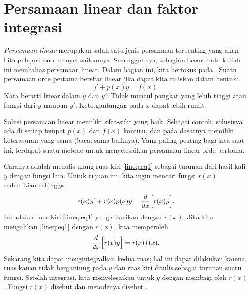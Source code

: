 \sectionnewpage
\section{Persamaan linear dan faktor integrasi}
\label{intfactor:section}



\emph{Persamaan linear}
merupakan salah satu jenis persamaan terpenting yang akan kita pelajari cara menyelesaikannya.
Sesungguhnya, sebagian besar mata kuliah ini membahas persamaan
linear. Dalam bagian ini, kita berfokus pada
\emph{}.
Suatu persamaan orde pertama bersifat linear jika dapat kita tuliskan
dalam bentuk:
\begin{equation} \label{lineq:eq1}
y' + p(x) y = f(x) .
\end{equation}
Kata
 berarti linear dalam $y$ dan $y'$:
Tidak muncul pangkat yang lebih tinggi atau fungsi dari $y$ maupun $y'$.
Ketergantungan pada $x$ dapat lebih
rumit.

Solusi persamaan linear memiliki sifat-sifat yang baik. Sebagai contoh,
solusinya ada di setiap tempat $p(x)$ dan $f(x)$ kontinu,
dan pada dasarnya memiliki
keteraturan yang sama (baca: sama baiknya). Yang paling penting bagi kita saat ini,
terdapat suatu metode untuk menyelesaikan persamaan linear orde pertama.

Caranya adalah menulis ulang ruas kiri
\eqref{lineq:eq1} sebagai turunan dari hasil kali $y$ dengan fungsi
lain.
Untuk tujuan ini,
kita ingin mencari fungsi $r(x)$ sedemikian sehingga
\begin{equation*}
r(x) y' + r(x) p(x) y = \frac{d}{dx}\Bigl[ r(x) y \Bigr] .
\end{equation*}
Ini adalah ruas kiri
\eqref{lineq:eq1} yang dikalikan dengan $r(x)$. Jika kita mengalikan \eqref{lineq:eq1} dengan
$r(x)$, kita memperoleh
\begin{equation*}
\frac{d}{dx}\Bigl[ r(x) y \Bigr] = r(x)f(x) .
\end{equation*}
Sekarang kita dapat mengintegralkan kedua ruas; hal ini dapat dilakukan karena
ruas kanan tidak bergantung pada $y$ dan ruas kiri
ditulis sebagai turunan suatu fungsi. Setelah integrasi, kita menyelesaikan untuk $y$
dengan membagi oleh $r(x)$.
Fungsi $r(x)$ disebut \emph{} dan
metodenya disebut \emph{}.

